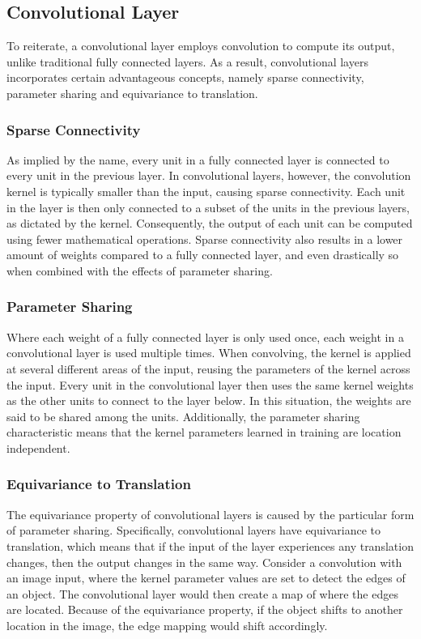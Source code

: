 \subsection{Convolutional Layer}

To reiterate, a convolutional layer employs convolution to compute its output, unlike traditional fully connected layers. As a result, convolutional layers incorporates certain advantageous concepts, namely sparse connectivity, parameter sharing and equivariance to translation.

\subsubsection{Sparse Connectivity}

As implied by the name, every unit in a fully connected layer is connected to every unit in the previous layer. In convolutional layers, however, the convolution kernel is typically smaller than the input, causing sparse connectivity. Each unit in the layer is then only connected to a subset of the units in the previous layers, as dictated by the kernel. Consequently, the output of each unit can be computed using fewer mathematical operations. Sparse connectivity also results in a lower amount of weights compared to a fully connected layer, and even drastically so when combined with the effects of parameter sharing.

\subsubsection{Parameter Sharing}

Where each weight of a fully connected layer is only used once, each weight in a convolutional layer is used multiple times. When convolving, the kernel is applied at several different areas of the input, reusing the parameters of the kernel across the input. Every unit in the convolutional layer then uses the same kernel weights as the other units to connect to the layer below. In this situation, the weights are said to be shared among the units. Additionally, the parameter sharing characteristic means that the kernel parameters learned in training are location independent.

\subsubsection{Equivariance to Translation}

The equivariance property of convolutional layers is caused by the particular form of parameter sharing. Specifically, convolutional layers have equivariance to translation, which means that if the input of the layer experiences any translation changes, then the output changes in the same way. Consider a convolution with an image input, where the kernel parameter values are set to detect the edges of an object. The convolutional layer would then create a map of where the edges are located. Because of the equivariance property, if the object shifts to another location in the image, the edge mapping would shift accordingly.

